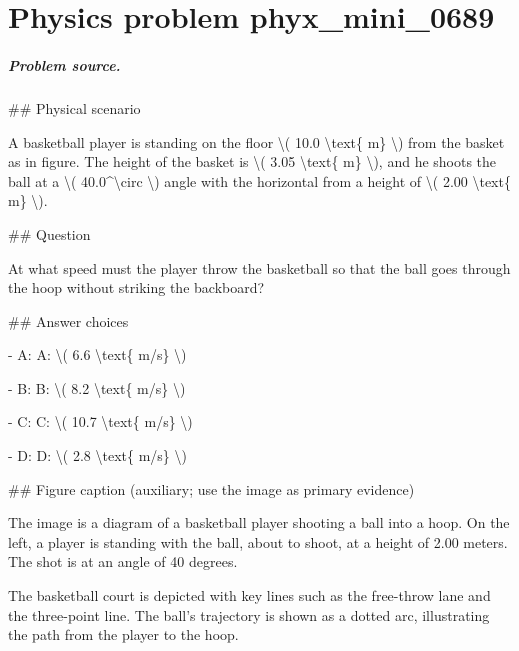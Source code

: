 
\chapter{Physics problem phyx\_mini\_0689}
\label{ch:PhyXMiniProblems_problem_phyx_mini_0689}

\paragraph{Problem source.}
\#\# Physical scenario

A basketball player is standing on the floor \textbackslash{}( 10.0 \textbackslash{}text\{ m\} \textbackslash{}) from the basket as in figure. The height of the basket is \textbackslash{}( 3.05 \textbackslash{}text\{ m\} \textbackslash{}), and he shoots the ball at a \textbackslash{}( 40.0\textasciicircum{}\textbackslash{}circ \textbackslash{}) angle with the horizontal from a height of \textbackslash{}( 2.00 \textbackslash{}text\{ m\} \textbackslash{}).

\#\# Question

At what speed must the player throw the basketball so that the ball goes through the hoop without striking the backboard?

\#\# Answer choices

- A: A: \textbackslash{}( 6.6 \textbackslash{}text\{ m/s\} \textbackslash{})

- B: B: \textbackslash{}( 8.2 \textbackslash{}text\{ m/s\} \textbackslash{})

- C: C: \textbackslash{}( 10.7 \textbackslash{}text\{ m/s\} \textbackslash{})

- D: D: \textbackslash{}( 2.8 \textbackslash{}text\{ m/s\} \textbackslash{})

\#\# Figure caption (auxiliary; use the image as primary evidence)

The image is a diagram of a basketball player shooting a ball into a hoop. On the left, a player is standing with the ball, about to shoot, at a height of 2.00 meters. The shot is at an angle of 40 degrees.

The basketball court is depicted with key lines such as the free-throw lane and the three-point line. The ball's trajectory is shown as a dotted arc, illustrating the path from the player to the hoop.

